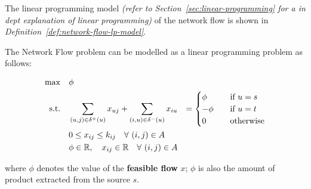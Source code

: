\documentclass[english]{article}
\begin{document}
The linear programming model \textit{(refer to Section~\ref{sec:linear-programming} for a in dept explanation of linear programming)} of the network flow is shown in \textit{Definition~\ref{def:network-flow-lp-model}}.

\begin{definition}
  \label{def:network-flow-lp-model}

  The Network Flow problem can be modelled as a linear programming problem as follows:

  \begin{gather*}
    \begin{aligned}
      \max \quad        & \phi                                                                                                                                                                                       \\
      \text{s.t.} \quad & \displaystyle \sum_{\left( u, j \right) \in \delta^+(u)} x_{uj} + \displaystyle \sum_{\left( i, u \right) \in \delta^-(u)} x_{iu} & = \begin{cases}
                                                                                                                                                                  \phi \quad   & \text{if } u = s \\
                                                                                                                                                                  - \phi \quad & \text{if } u = t \\
                                                                                                                                                                  0 \quad      & \text{otherwise}
                                                                                                                                                                \end{cases} \\
                        & 0 \leq x_{ij} \leq k_{ij} \quad \forall \, \left( i, j \right) \in A                                                                                                                       \\
                        & \phi \in \mathbb{R}, \quad x_{ij} \in \mathbb{R} \quad \forall \, \left( i, j \right) \in A
    \end{aligned}
  \end{gather*}

  where \(\phi\) denotes the value of the \textbf{feasible flow} \(x\);
  \(\phi\) is also the amount of product extracted from the source \(s\).
\end{definition}
\end{document}
